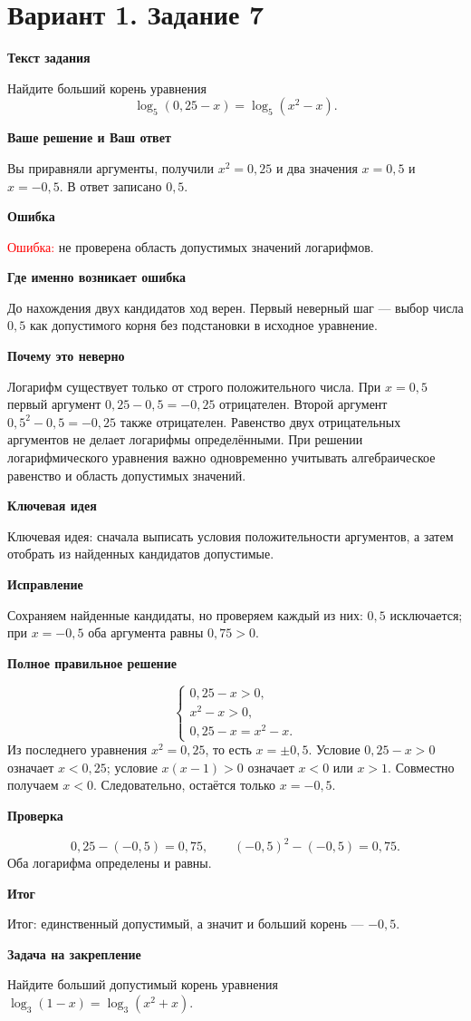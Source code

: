 \documentclass[11pt,a4paper]{article}
\newcommand{\Part}[1]{\par\medskip\noindent\textbf{#1}\par\smallskip}
\newcommand{\Task}[2]{\clearpage\phantomsection\label{task:#1}\section*{#2}}
\newcommand{\Err}[1]{\textcolor{red}{Ошибка:} #1}
\newcommand{\Idea}[1]{\textcolor{blue!60!black}{Ключевая идея:} #1}
\newcommand{\Result}[1]{\textcolor{teal!60!black}{Итог:} #1}
\begin{document}
\Task{v17}{Вариант 1. Задание 7}
\Part{Текст задания}
Найдите больший корень уравнения
\[\log_5(0{,}25-x)=\log_5(x^2-x).\]
\Part{Ваше решение и Ваш ответ}
Вы приравняли аргументы, получили $x^2=0{,}25$ и два значения $x=0{,}5$ и $x=-0{,}5$. В ответ записано $0{,}5$.
\Part{Ошибка}
\Err{не проверена область допустимых значений логарифмов.}
\Part{Где именно возникает ошибка}
До нахождения двух кандидатов ход верен. Первый неверный шаг --- выбор числа $0{,}5$ как допустимого корня без подстановки в исходное уравнение.
\Part{Почему это неверно}
Логарифм существует только от строго положительного числа. При $x=0{,}5$ первый аргумент $0{,}25-0{,}5=-0{,}25$ отрицателен. Второй аргумент $0{,}5^2-0{,}5=-0{,}25$ также отрицателен. Равенство двух отрицательных аргументов не делает логарифмы определёнными. При решении логарифмического уравнения важно одновременно учитывать алгебраическое равенство и область допустимых значений.
\Part{Ключевая идея}
\Idea{сначала выписать условия положительности аргументов, а затем отобрать из найденных кандидатов допустимые.}
\Part{Исправление}
Сохраняем найденные кандидаты, но проверяем каждый из них: $0{,}5$ исключается; при $x=-0{,}5$ оба аргумента равны $0{,}75>0$.
\Part{Полное правильное решение}
\[
\begin{cases}0{,}25-x>0,\\x^2-x>0,\\0{,}25-x=x^2-x.\end{cases}
\]
Из последнего уравнения $x^2=0{,}25$, то есть $x=\pm0{,}5$. Условие $0{,}25-x>0$ означает $x<0{,}25$; условие $x(x-1)>0$ означает $x<0$ или $x>1$. Совместно получаем $x<0$. Следовательно, остаётся только $x=-0{,}5$.
\Part{Проверка}
\[0{,}25-(-0{,}5)=0{,}75,\qquad (-0{,}5)^2-(-0{,}5)=0{,}75.\]
Оба логарифма определены и равны.
\Part{Итог}
\Result{единственный допустимый, а значит и больший корень --- $-0{,}5$.}
\Part{Задача на закрепление}
Найдите больший допустимый корень уравнения $\log_3(1-x)=\log_3(x^2+x)$.
\end{document}
